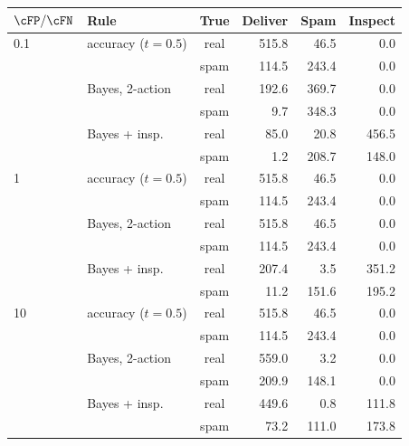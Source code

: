 \begin{tabular}{llcrrr}
\toprule
$\cFP/\cFN$ & Rule & True & Deliver & Spam & Inspect \\
\midrule
0.1 & accuracy ($t=0.5$) & real & 515.8 & 46.5 & 0.0 \\
 &  & spam & 114.5 & 243.4 & 0.0 \\
 & Bayes, 2-action & real & 192.6 & 369.7 & 0.0 \\
 &  & spam & 9.7 & 348.3 & 0.0 \\
 & Bayes + insp. & real & 85.0 & 20.8 & 456.5 \\
 &  & spam & 1.2 & 208.7 & 148.0 \\
\midrule
1 & accuracy ($t=0.5$) & real & 515.8 & 46.5 & 0.0 \\
 &  & spam & 114.5 & 243.4 & 0.0 \\
 & Bayes, 2-action & real & 515.8 & 46.5 & 0.0 \\
 &  & spam & 114.5 & 243.4 & 0.0 \\
 & Bayes + insp. & real & 207.4 & 3.5 & 351.2 \\
 &  & spam & 11.2 & 151.6 & 195.2 \\
\midrule
10 & accuracy ($t=0.5$) & real & 515.8 & 46.5 & 0.0 \\
 &  & spam & 114.5 & 243.4 & 0.0 \\
 & Bayes, 2-action & real & 559.0 & 3.2 & 0.0 \\
 &  & spam & 209.9 & 148.1 & 0.0 \\
 & Bayes + insp. & real & 449.6 & 0.8 & 111.8 \\
 &  & spam & 73.2 & 111.0 & 173.8 \\
\bottomrule
\end{tabular}
